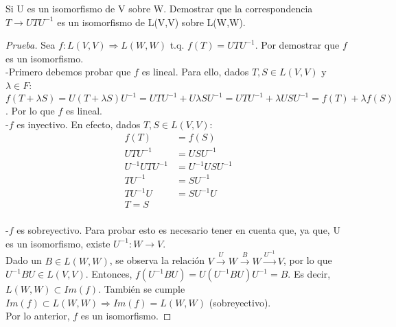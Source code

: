 \documentclass[12pt]{article}
\newenvironment{problem}[2][Problem]{\begin{trivlist}
\item[\hskip \labelsep {\bfseries #1}\hskip \labelsep {\bfseries #2.}]}{\end{trivlist}}
\begin{document}
\begin{problem}[Problema]{3.b}
Si U es un isomorfismo de V sobre W. Demostrar que la correspondencia  $T \longrightarrow UTU^{-1}$  es un isomorfismo de L(V,V) sobre L(W,W).
\end{problem}

\begin{proof} [Prueba]
Sea $f:L(V,V) \Longrightarrow L(W,W)$ t.q. $f(T)=UTU^{-1}$. Por demostrar que $f$ es un isomorfismo.\\

-Primero debemos probar que $f$ es lineal. Para ello, dados $T,S \in L(V,V)$ y $\lambda \in F$: $f(T+\lambda S)=U(T+\lambda S)U^{-1}
	=UTU^{-1}+U\lambda SU^{-1}=UTU^{-1}+\lambda USU^{-1}
	=f(T)+\lambda f(S)$. Por lo que $f$ es lineal.\\
	
-$f$ es inyectivo. En efecto, dados $T, S \in L(V,V)$: 
\begin{align*}
f(T) & = f(S) \\
UTU^{-1} & = USU^{-1}\\
U^{-1}UTU^{-1} & = U^{-1}USU^{-1}\\
TU^{-1} & = SU^{-1}\\
TU^{-1}U & = SU^{-1}U\\
T=S
\end{align*}\\

-$f$ es sobreyectivo. Para probar esto es necesario tener en cuenta que, ya que, U es un isomorfismo, existe $U^{-1}:W \rightarrow V$. \\
Dado un $B \in L(W,W)$, se observa la relación $V \xrightarrow{U} W \xrightarrow{B} W \xrightarrow{U^{-1}} V$, por lo que $U^{-1}BU \in L(V,V)$. Entonces, $f(U^{-1}BU)=U(U^{-1}BU)U^{-1}=B$. Es decir, $L(W,W) \subset Im(f)$. También se cumple $Im(f) \subset L(W,W) \Longrightarrow Im(f)=L(W,W)$ (sobreyectivo).\\
Por lo anterior, $f$ es un isomorfismo.
\end{proof} 


\end{document}
